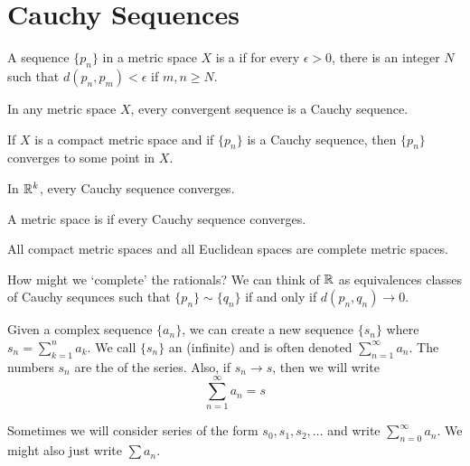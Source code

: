 \documentclass{mathnotes}
\begin{document}
\section*{Cauchy Sequences}

\begin{bdefi}
  A sequence $\{p_n\}$ in a metric space $X$ is a  if
  for every $\epsilon>0$, there is an integer $N$ such that
  $d(p_n,p_m)<\epsilon$ if $m,n\ge N$.
\end{bdefi}

\begin{prop}
  In any metric space $X$, every convergent sequence is a Cauchy sequence.
\end{prop}

\begin{prop}
  If $X$ is a compact metric space and if $\{p_n\}$ is a Cauchy sequence, then
  $\{p_n\}$ converges to some point in $X$.
\end{prop}

\begin{prop}
  In $\mathbb{R}^k$, every Cauchy sequence converges.
\end{prop}

\begin{defi}
  A metric space is  if every Cauchy sequence converges.
\end{defi}

\begin{prop}
  All compact metric spaces and all Euclidean spaces are complete metric
  spaces.
\end{prop}

\begin{note}
  How might we `complete' the rationals? We can think of $\mathbb{R}$ as equivalences
  classes of Cauchy sequnces such that $\{p_n\}\sim\{q_n\}$ if and only if
  $d(p_n,q_n)\to0$.
\end{note}

\begin{bdefi}
  Given a complex sequence $\{a_n\}$, we can create a new sequence $\{s_n\}$
  where $s_n=\sum_{k=1}^na_k$. We call $\{s_n\}$ an (infinite) 
  and is often denoted $\sum_{n=1}^\infty a_n$. The numbers $s_n$ are the
   of the series. Also, if $s_n\to s$, then we will write
  $$\sum_{n=1}^\infty a_n=s$$
\end{bdefi}

\begin{note}
  Sometimes we will consider series of the form $s_0,s_1,s_2,\ldots$ and write
  $\sum_{n=0}^\infty a_n$. We might also just write $\sum a_n$.
\end{note}
\end{document}
